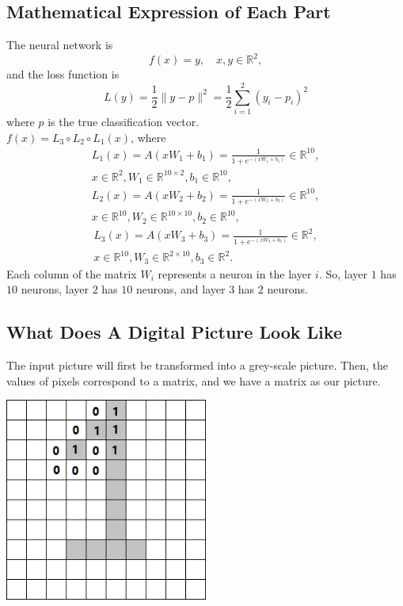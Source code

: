 \subsection{Mathematical Expression of Each Part}
The neural network is \[f(x)=y,\quad x,y\in\mathbb{R}^2,\]
and the loss function is \[L(y)=\frac{1}{2}\|y-p\|^2=\frac{1}{2}\sum_{i=1}^2{(y_i-p_i)^2}\]
where $p$ is the true classification vector.\\
$f(x)=L_3\circ L_2\circ L_1(x)$, where
\[
\begin{split}
L_1(x)=A(xW_1+b_1)=\frac{1}{1+e^{-(xW_1+b_1)}}\in\mathbb{R}^{10},\\
x\in\mathbb{R}^{2},W_1\in\mathbb{R}^{10\times2},b_1\in\mathbb{R}^{10},
\end{split}
\]
\[
\begin{split}
L_2(x)=A(xW_2+b_2)=\frac{1}{1+e^{-(xW_2+b_2)}}\in\mathbb{R}^{10},\\
x\in\mathbb{R}^{10},W_2\in\mathbb{R}^{10\times10},b_2\in\mathbb{R}^{10},
\end{split}
\]
\[
\begin{split}
L_3(x)=A(xW_3+b_3)=\frac{1}{1+e^{-(xW_3+b_3)}}\in\mathbb{R}^{2},\\
x\in\mathbb{R}^{10},W_3\in\mathbb{R}^{2\times10},b_3\in\mathbb{R}^{2}.
\end{split}
\]
Each column of the matrix $W_i$ represents a neuron in the layer $i$. So, layer $1$ has $10$ neurons, layer $2$ has $10$ neurons, and layer $3$ has $2$ neurons.\\

\subsection{What Does A Digital Picture Look Like}
The input picture will first be transformed into a grey-scale picture. Then, the values of pixels correspond to a matrix, and we have a matrix as our picture.

\begin{center}
\includegraphics[width=0.5\textwidth]{figures/pcNN_mesh.png}
\end{center}


